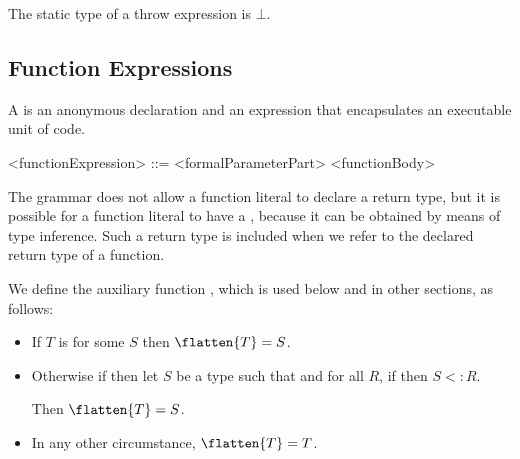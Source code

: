 \documentclass[makeidx]{article}
\begin{document}

\LMHash{}%
The static type of a throw expression is $\bot$.


\subsection{Function Expressions}

\LMHash{}%
A 
is an anonymous declaration and an expression
that encapsulates an executable unit of code.

\begin{grammar}
<functionExpression> ::= <formalParameterPart> <functionBody>
\end{grammar}

\LMHash{}%
The grammar does not allow a function literal to declare a return type,
but it is possible for a function literal to have a
,
because it can be obtained by means of type inference.
Such a return type is included
when we refer to the declared return type of a function.


\LMHash{}%
We define the auxiliary function
,
which is used below and in other sections, as follows:

\begin{itemize}
\item If $T$ is  for some $S$ then $\flatten{T} = S$.

\item Otherwise if
then let $S$ be a type such that
and for all $R$, if
then $S <: R$.


Then $\flatten{T} = S$.

\item In any other circumstance, $\flatten{T} = T$.
\end{itemize}
\end{document}
